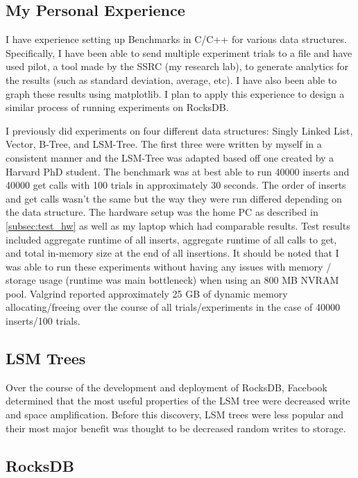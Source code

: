 \documentclass[twocolumn,11pt]{article}
\begin{document}
\subsection{My Personal Experience}
\label{subsec:personal_experience}

I have experience setting up Benchmarks in C/C++ for various data structures.
Specifically, I have been able to send multiple experiment trials to a file and
have used pilot, a tool made by the SSRC (my research lab), to generate
analytics for the results (such as standard deviation, average, etc). I have
also been able to graph these results using matplotlib. I plan to apply this
experience to design a similar process of running experiments on RocksDB.

I previously did experiments on four different data structures: Singly Linked
List, Vector, B-Tree, and LSM-Tree. The first three were written by myself in a
consistent manner and the LSM-Tree was adapted based off one created by a
Harvard PhD student. The benchmark was at best able to run 40000 inserts and
40000 get calls with 100 trials in approximately 30 seconds. The order of
inserts and get calls wasn't the same but the way they were run differed
depending on the data structure. The hardware setup was the home PC as described
in \ref{subsec:test_hw} as well as my laptop which had comparable results. Test
results included aggregate runtime of all inserts, aggregate runtime of all
calls to get, and total in-memory size at the end of all insertions. It should
be noted that I was able to run these experiments without having any issues with
memory / storage usage (runtime was main bottleneck) when using an 800 MB NVRAM
pool. Valgrind reported approximately 25 GB of dynamic memory allocating/freeing
over the course of all trials/experiments in the case of 40000 inserts/100
trials.

\subsection{LSM Trees}


Over the course of the development and deployment of RocksDB, Facebook
determined that the most useful properties of the LSM tree were decreased write
and space amplification. Before this discovery, LSM trees were less popular and
their most major benefit was thought to be decreased random writes to storage.

\subsection{RocksDB}
\end{document}
